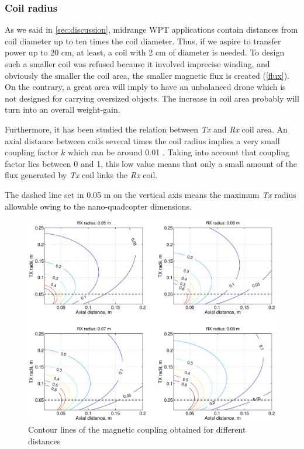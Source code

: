 				\subsubsection{Coil radius}\label{subsec:geo} %
As we said in \ref{sec:discussion}, midrange WPT applications contain distances from coil diameter up to ten times the coil diameter. Thus, if we aspire to transfer power up to 20 cm, at least, a coil with 2 cm of diameter is needed. To design such a smaller coil was refused because it involved imprecise winding, and obviously the smaller the coil area, the smaller magnetic flux is created (\ref{flux}). On the contrary, a great area will imply to have an unbalanced drone which is not designed for carrying oversized objects. The increase in coil area probably will turn into an overall weight-gain.

Furthermore, it has been studied the relation between \textit{Tx} and \textit{Rx} coil area. An axial distance between coils several times the coil radius implies a very small coupling factor $k$ which can be around 0.01 \cite{lowCouplingFactor}. Taking into account that coupling factor lies between 0 and 1, this low value means that only a small amount of the flux generated by \textit{Tx} coil links the \textit{Rx} coil. 

The dashed line set in 0.05 m on the vertical axis means the maximum \textit{Tx} radius allowable owing to the nano-quadcopter dimensions.

\begin{figure}[htb]
\begin{center}
\includegraphics[width=1\textwidth]{./images/contourLines2}
\caption{Contour lines of the magnetic coupling obtained for different distances}
\label{F:contourLines}
\end{center}
\end{figure}

